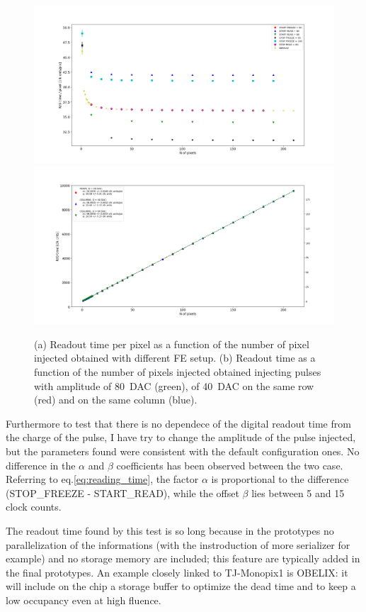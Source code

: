         \begin{figure}[h!]
            \centering
            \includegraphics[width=.9\linewidth]{figures/charaterization/parameters_points.png}
            \includegraphics[width=.9\linewidth]{figures/charaterization/default_line.png}
            \caption{(a) Readout time per pixel as a function of the number of pixel injected obtained with different FE setup. (b) Readout time as a function of the number of pixels injected obtained injecting pulses with amplitude of \SI{80}{DAC} (green), of \SI{40}{DAC} on the same row (red) and on the same column (blue).}
            \label{fig:dead_time}
        \end{figure}
        Furthermore to test that there is no dependece of the digital readout time from the charge of the pulse, I have try to change the amplitude of the pulse injected, but the parameters found were consistent with the default configuration ones.
        No difference in the $\alpha$ and $\beta$ coefficients has been observed between the two case.
        Referring to eq.\ref{eq:reading_time}, the factor $\alpha$ is proportional to the difference (STOP\_FREEZE - START\_READ), while the offset $\beta$ lies between 5 and 15 clock counts.

        The readout time found by this test is so long because in the prototypes no parallelization of the informations (with the instroduction of more serializer for example) and no storage memory are included; this feature are typically added in the final prototypes. An example closely linked to TJ-Monopix1 is OBELIX: it will include on the chip a storage buffer to optimize the dead time and to keep a low occupancy even at high fluence. 


